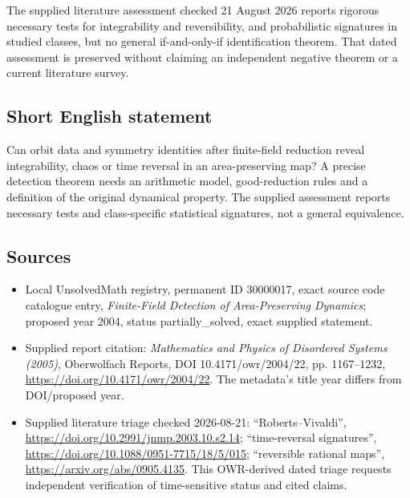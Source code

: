 \documentclass[11pt]{article}
\begin{document}
The supplied literature assessment checked 21 August 2026 reports rigorous necessary tests for integrability and reversibility, and probabilistic signatures in studied classes, but no general if-and-only-if identification theorem. That dated assessment is preserved without claiming an independent negative theorem or a current literature survey.
\subsection{Short English statement}
Can orbit data and symmetry identities after finite-field reduction reveal integrability, chaos or time reversal in an area-preserving map? A precise detection theorem needs an arithmetic model, good-reduction rules and a definition of the original dynamical property. The supplied assessment reports necessary tests and class-specific statistical signatures, not a general equivalence.
\subsection{Sources}
\begin{itemize}
\item Local UnsolvedMath registry, permanent ID 30000017, exact source code catalogue entry, \emph{Finite-Field Detection of Area-Preserving Dynamics}; proposed year 2004, status partially\_solved, exact supplied statement.
\item Supplied report citation: \emph{Mathematics and Physics of Disordered Systems (2005)}, Oberwolfach Reports, DOI 10.4171/owr/2004/22, pp. 1167--1232, \url{https://doi.org/10.4171/owr/2004/22}. The metadata's title year differs from DOI/proposed year.
\item Supplied literature triage checked 2026-08-21: ``Roberts--Vivaldi'', \url{https://doi.org/10.2991/jnmp.2003.10.s2.14}; ``time-reversal signatures'', \url{https://doi.org/10.1088/0951-7715/18/5/015}; ``reversible rational maps'', \url{https://arxiv.org/abs/0905.4135}. This OWR-derived dated triage requests independent verification of time-sensitive status and cited claims.
\end{itemize}
\end{document}
